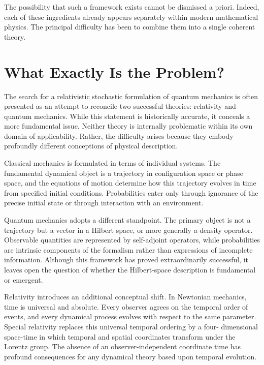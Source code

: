 The possibility that such a framework exists cannot be dismissed a priori.
Indeed, each of these ingredients already appears separately within modern
mathematical physics. The principal difficulty has been to combine them into a
single coherent theory.
\section{What Exactly Is the Problem?}

The search for a relativistic stochastic formulation of quantum mechanics is
often presented as an attempt to reconcile two successful theories:
relativity and quantum mechanics. While this statement is historically
accurate, it conceals a more fundamental issue. Neither theory is internally
problematic within its own domain of applicability. Rather, the difficulty
arises because they embody profoundly different conceptions of physical
description.

Classical mechanics is formulated in terms of individual systems. The
fundamental dynamical object is a trajectory in configuration space or phase
space, and the equations of motion determine how this trajectory evolves in
time from specified initial conditions. Probabilities enter only through
ignorance of the precise initial state or through interaction with an
environment.

Quantum mechanics adopts a different standpoint. The primary object is not a
trajectory but a vector in a Hilbert space, or more generally a density
operator. Observable quantities are represented by self-adjoint operators,
while probabilities are intrinsic components of the formalism rather than
expressions of incomplete information. Although this framework has proved
extraordinarily successful, it leaves open the question of whether the
Hilbert-space description is fundamental or emergent.

Relativity introduces an additional conceptual shift. In Newtonian mechanics,
time is universal and absolute. Every observer agrees on the temporal order of
events, and every dynamical process evolves with respect to the same parameter.
Special relativity replaces this universal temporal ordering by a four-
dimensional space-time in which temporal and spatial coordinates transform
under the Lorentz group. The absence of an observer-independent coordinate
time has profound consequences for any dynamical theory based upon temporal
evolution.

